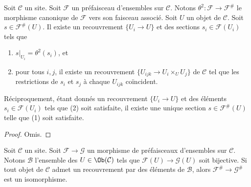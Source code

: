 \begin{lemma}
\label{lemma-sections-sheafification}
Soit $\mathcal{C}$ un site.
Soit $\mathcal{F}$ un préfaisceau d’ensembles sur $\mathcal{C}$.
Notons $\theta^2 : \mathcal{F} \to \mathcal{F}^\#$ le morphisme canonique
de $\mathcal{F}$ vers son faisceau associé.
Soit $U$ un objet de $\mathcal{C}$.
Soit $s \in \mathcal{F}^\#(U)$. Il existe
un recouvrement $\{U_i \to U\}$ et des sections
$s_i \in \mathcal{F}(U_i)$ tels que
\begin{enumerate}
\item $s|_{U_i} = \theta^2(s_i)$, et
\item pour tous $i, j$, il existe un recouvrement
$\{U_{ijk} \to U_i \times_U U_j\}$ de $\mathcal{C}$ tel que
les restrictions de $s_i$ et $s_j$ à chaque $U_{ijk}$ coïncident.
\end{enumerate}
Réciproquement, étant donnés un recouvrement $\{U_i \to U\}$ et des éléments
$s_i \in \mathcal{F}(U_i)$ tels que (2) soit satisfaite, il
existe une unique section $s \in \mathcal{F}^\#(U)$ telle
que (1) soit satisfaite.
\end{lemma}

\begin{proof}
Omis.
\end{proof}

\begin{lemma}
\label{lemma-isomorphism-sheafifications}
Soit $\mathcal{C}$ un site. Soit $\mathcal{F} \to \mathcal{G}$ un morphisme
de préfaisceaux d’ensembles sur $\mathcal{C}$. Notons $\mathcal{B}$ l’ensemble des
$U \in \Ob(\mathcal{C})$ tels que $\mathcal{F}(U) \to \mathcal{G}(U)$
soit bijective. Si tout objet de $\mathcal{C}$ admet un recouvrement par des éléments
de $\mathcal{B}$, alors $\mathcal{F}^\# \to \mathcal{G}^\#$ est un isomorphisme.
\end{lemma}

